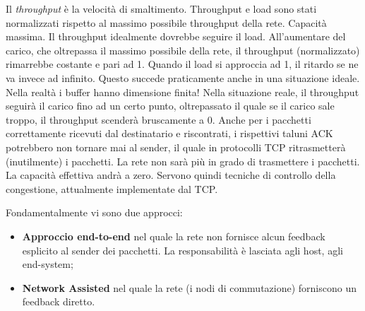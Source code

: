 Il \textit{throughput} è la velocità di smaltimento. Throughput e load sono stati normalizzati rispetto al massimo possibile throughput della rete. Capacità massima. Il throughput idealmente dovrebbe seguire il load. All'aumentare del carico, che oltrepassa il massimo possibile della rete, il throughput (normalizzato) rimarrebbe costante e pari ad 1. Quando il load si approccia ad 1, il ritardo se ne va invece ad infinito. Questo succede praticamente anche in una situazione ideale. Nella realtà i buffer hanno dimensione finita! Nella situazione reale, il throughput seguirà il carico fino ad un certo punto, oltrepassato il quale se il carico sale troppo, il throughput scenderà bruscamente a 0. Anche per i pacchetti correttamente ricevuti dal destinatario e riscontrati, i rispettivi taluni ACK potrebbero non tornare mai al sender, il quale in protocolli TCP ritrasmetterà (inutilmente) i pacchetti. La rete non sarà più in grado di trasmettere i pacchetti. La capacità effettiva andrà a zero. Servono quindi tecniche di controllo della congestione, attualmente implementate dal TCP.

Fondamentalmente vi sono due approcci:

\begin{itemize}
\item{\textbf{Approccio end-to-end}} nel quale la rete non fornisce alcun feedback esplicito al sender dei pacchetti. La responsabilità è lasciata agli host, agli end-system;
\item{\textbf{Network Assisted}} nel quale la rete (i nodi di commutazione) forniscono un feedback diretto.
\end{itemize}

